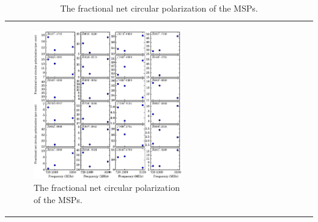 \documentclass[useAMS,usenatbib]{mn2e}
\begin{document}
\begin{table}
\begin{center}
\begin{tabular}{lcccccccccccc}
\begin{figure}
\begin{center}
\includegraphics[width=6 in]{fabsCircular.ps}
\caption{The fractional net circular polarization of the MSPs.} 
\label{fabsCircular}
\end{center}
\end{figure}




\end{tabular}
\end{center}
\end{table}
\end{document}
